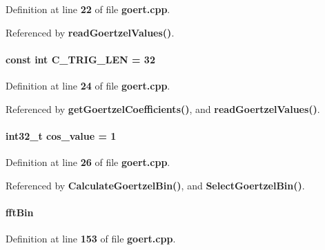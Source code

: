 Definition at line {\bf 22} of file {\bf goert.\+cpp}.



Referenced by {\bf read\+Goertzel\+Values()}.

\paragraph[{C\+\_\+\+T\+R\+I\+G\+\_\+\+L\+EN}]{\setlength{\rightskip}{0pt plus 5cm}const {\bf int} C\+\_\+\+T\+R\+I\+G\+\_\+\+L\+EN = 32\hspace{0.3cm}{\ttfamily [static]}}\label{goert_8cpp_a0e7a9da816caa7cc7f45ce90a0f3c043}


Definition at line {\bf 24} of file {\bf goert.\+cpp}.



Referenced by {\bf get\+Goertzel\+Coefficients()}, and {\bf read\+Goertzel\+Values()}.

\paragraph[{cos\+\_\+value}]{\setlength{\rightskip}{0pt plus 5cm}int32\+\_\+t cos\+\_\+value = 1\hspace{0.3cm}{\ttfamily [static]}}\label{goert_8cpp_a07d48bd4712c9b399f8b40a3d0c26058}


Definition at line {\bf 26} of file {\bf goert.\+cpp}.



Referenced by {\bf Calculate\+Goertzel\+Bin()}, and {\bf Select\+Goertzel\+Bin()}.

\paragraph[{fft\+Bin}]{ fft\+Bin\hspace{0.3cm}{\ttfamily [static]}}\label{goert_8cpp_afe38a9fb1ed704a1ed66e086b6f00481}


Definition at line {\bf 153} of file {\bf goert.\+cpp}.



